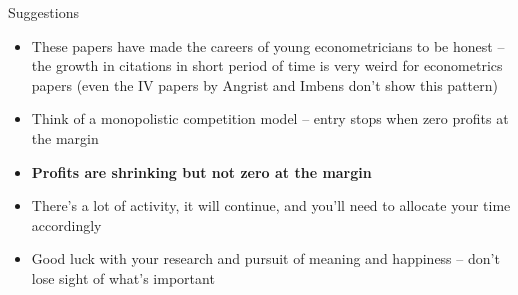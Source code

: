 \documentclass{beamer}
\begin{document}
\begin{frame}{Suggestions}

\begin{itemize}

\item These papers have made the careers of young econometricians to be honest -- the growth in citations in short period of time is very weird for econometrics papers (even the IV papers by Angrist and Imbens don't show this pattern)
\item Think of a monopolistic competition model -- entry stops when zero profits at the margin
\item \textbf{Profits are shrinking but not zero at the margin}
\item There's a lot of activity, it will continue, and you'll need to allocate your time accordingly
\item Good luck with your research and pursuit of meaning and happiness -- don't lose sight of what's important

\end{itemize}

\end{frame}
\end{document}
